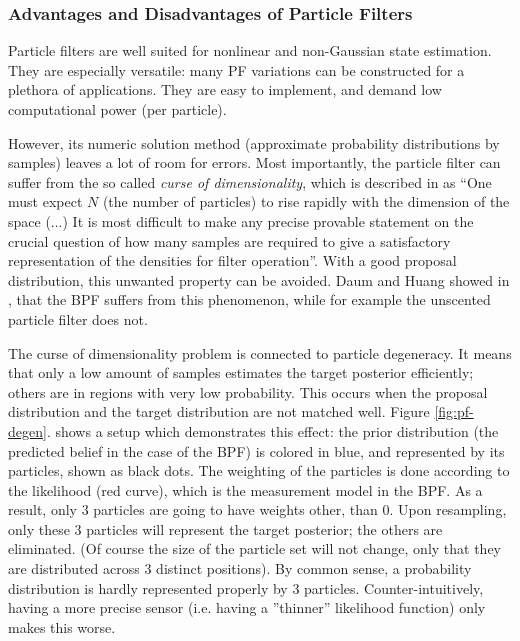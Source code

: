 \subsubsection{Advantages and Disadvantages of Particle Filters}\label{sec:pf_adv_disadv}
Particle filters are well suited for nonlinear and non-Gaussian state estimation. They are especially versatile: many PF variations can be constructed for a plethora of applications. They are easy to implement, and demand low computational power (per particle).

However, its numeric solution method (approximate probability distributions by samples) leaves a lot of room for errors. Most importantly, the particle filter can suffer from the so called \emph{curse of dimensionality}, which is described in \cite{Gordon1993} as ``One must expect $N$ (the number of particles) to rise rapidly with the dimension of the space (...) It is most difficult to make any precise provable statement on the crucial question of how many samples are required to give a satisfactory representation of the densities for filter operation''. With a good proposal distribution, this unwanted property can be avoided. Daum and Huang showed in \cite{Daum2003}, that the BPF suffers from this phenomenon, while for example the unscented particle filter does not.

The curse of dimensionality problem is connected to particle degeneracy. It means that only a low amount of samples estimates the target posterior efficiently; others are in regions with very low probability. This occurs when the proposal distribution and the target distribution are not matched well. Figure \ref{fig:pf-degen}. shows a setup which demonstrates this effect: the prior distribution (the predicted belief in the case of the BPF) is colored in blue, and represented by its particles, shown as black dots. The weighting of the particles is done according to the likelihood (red curve), which is the measurement model in the BPF. As a result, only 3 particles are going to have weights other, than 0. Upon resampling, only these 3 particles will represent the target posterior; the others are eliminated. (Of course the size of the particle set will not change, only that they are distributed across 3 distinct positions). By common sense, a probability distribution is hardly represented properly by 3 particles. Counter-intuitively, having a more precise sensor (i.e. having a ''thinner'' likelihood function) only makes this worse.

